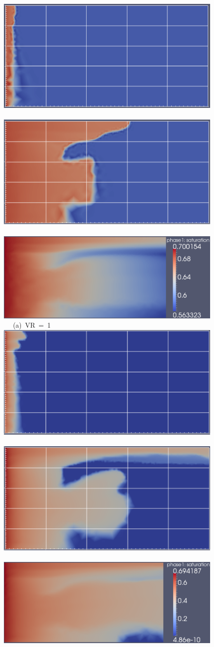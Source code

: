 \begin{landscape}
  \begin{figure}[ht]
    \vbox{ 
      \hbox{\includegraphics[width=.45\textwidth]{./Pics1/mr1_fixed/mr1_fixed_100_2.pdf}
            \includegraphics[width=.45\textwidth]{./Pics1/mr1_fixed/mr1_fixed_2500.pdf} 
            \includegraphics[width=.57\textwidth]{./Pics1/mr1_fixed/mr1_fixed_end_2.pdf} }
      \hbox{\hspace{8.0cm} (a) VR = 1}
      \vspace{1cm}
      \hbox{\includegraphics[width=.45\textwidth]{./Pics1/mr10_fixed/mr10_fixed_100_1.pdf}
            \includegraphics[width=.45\textwidth]{./Pics1/mr10_fixed/mr10_fixed_2500.pdf}
            \includegraphics[width=.57\textwidth]{./Pics1/mr10_fixed/mr10_fixed_end_2.pdf} }
}
\end{figure}
\end{landscape}
